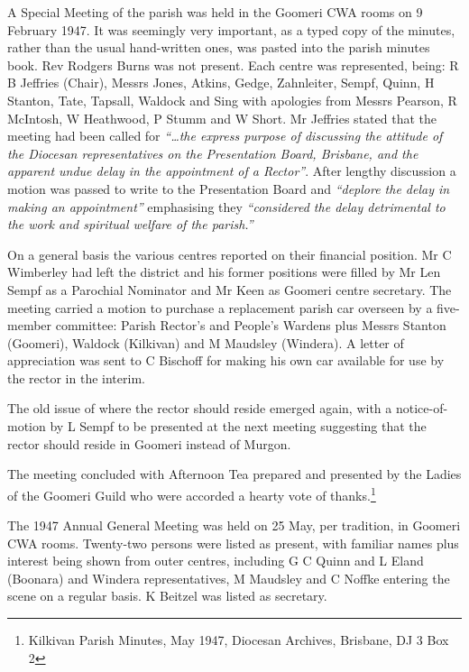 A Special Meeting of the parish was held in the Goomeri CWA rooms on 9 February 1947. It was seemingly very important, as a typed copy of the minutes, rather than the usual hand-written ones, was pasted into the parish minutes book. Rev Rodgers Burns was not present. Each centre was represented, being: R B Jeffries (Chair), Messrs Jones, Atkins, Gedge, Zahnleiter, Sempf, Quinn, H Stanton, Tate, Tapsall, Waldock and Sing with apologies from Messrs Pearson, R McIntosh, W Heathwood, P Stumm and W Short. Mr Jeffries stated that the meeting had been called for \emph{``\ldots the express purpose of discussing the attitude of the Diocesan representatives on the Presentation Board, Brisbane, and the apparent undue delay in the appointment of a Rector''}. After lengthy discussion a motion was passed to write to the Presentation Board and \emph{``deplore the delay in making an appointment''} emphasising they \emph{``considered the delay detrimental to the work and spiritual welfare of the parish.''}



On a general basis the various centres reported on their financial position. Mr C Wimberley had left the district and his former positions were filled by Mr Len Sempf as a Parochial Nominator and Mr Keen as Goomeri centre secretary. The meeting carried a motion to purchase a replacement parish car overseen by a five-member committee: Parish Rector's and People's Wardens plus Messrs Stanton (Goomeri), Waldock (Kilkivan) and M Maudsley (Windera). A letter of appreciation was sent to C Bischoff for making his own car available for use by the rector in the interim.



The old issue of where the rector should reside emerged again, with a notice-of-motion by L Sempf to be presented at the next meeting suggesting that the rector should reside in Goomeri instead of Murgon.



The meeting concluded with Afternoon Tea prepared and presented by the Ladies of the Goomeri Guild who were accorded a hearty vote of thanks.\footnote{Kilkivan Parish Minutes, May 1947, Diocesan Archives, Brisbane, DJ 3 Box 2}


The 1947 Annual General Meeting was held on 25 May, per tradition, in Goomeri CWA rooms. Twenty-two persons were listed as present, with familiar names plus interest being shown from outer centres, including G C Quinn and L Eland (Boonara) and Windera representatives, M Maudsley and C Noffke entering the scene on a regular basis. K Beitzel was listed as secretary.



